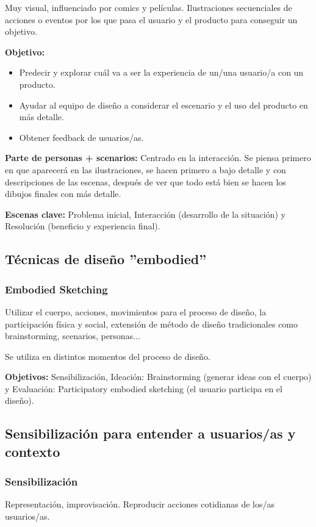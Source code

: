 \documentclass[12pt, twoside, openright]{report} %
\begin{document}
Muy visual, influenciado por comics y películas. Ilustraciones secuenciales de acciones o eventos por los que pasa el usuario y el producto para conseguir un objetivo.

\textbf{Objetivo: }
\begin{itemize}
	\item Predecir y explorar cuál va a ser la experiencia de un/una usuario/a con un producto.
	\item Ayudar al equipo de diseño a considerar el escenario y el uso del producto en más detalle.
	\item Obtener feedback de usuarios/as.
\end{itemize}

\textbf{Parte de personas + scenarios:} Centrado en la interacción. Se piensa primero en que aparecerá en las ilustraciones, se hacen primero a bajo detalle y con descripciones de las escenas, después de ver que todo está bien se hacen los dibujos finales con más detalle.

\textbf{Escenas clave:} Problema inicial, Interacción (desarrollo de la situación) y Resolución (beneficio y experiencia final).

\subsection{Técnicas de diseño ”embodied”}
\subsubsection{Embodied Sketching}
Utilizar el cuerpo, acciones, movimientos para el proceso de diseño, la participación física y social, extensión de método de diseño tradicionales como brainstorming, scenarios, personas...

Se utiliza en distintos momentos del proceso de diseño.

\textbf{Objetivos:} Sensibilización, Ideación: Brainstorming (generar ideas con el cuerpo) y Evaluación: Participatory embodied sketching (el usuario participa en el diseño).

\subsection{Sensibilización para entender a usuarios/as y contexto}
\subsubsection{Sensibilización}
Representación, improvisación. Reproducir acciones cotidianas de los/as usuarios/as.
\end{document}
